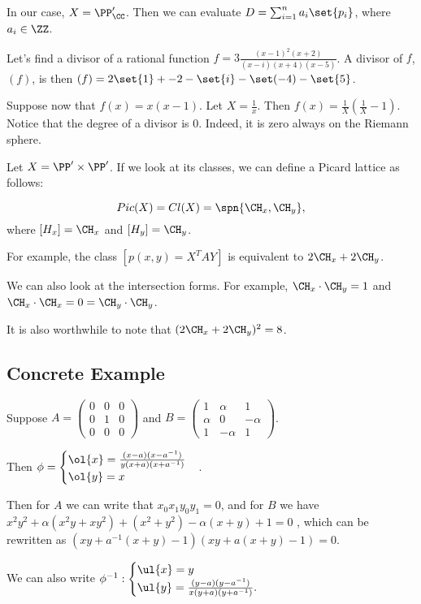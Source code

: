 \documentclass[11pt]{scrartcl}
\begin{document}
  In our case, $X = \PP_{\CC}'$. Then we can evaluate
  $D = \sum_{i=1}^{n} a_{i} \set{p_{i}}$, where $a_{i} \in \ZZ$.

  Let's find a divisor of a rational function
  $f = 3 \frac{(x-1)^{2}(x+2)}{(x-i)(x+4)(x-5)}$. A divisor of $f$,
  $(f)$, is then $(f) = 2\set{1}+{-2} - \set{i} - \set(-4) - \set{5}$.

  Suppose now that $f(x) = x(x-1)$. Let $X = \frac{1}{x}$. Then
  $f(x) = \frac{1}{X}(\frac{1}{X} - 1)$. Notice that the degree of a
  divisor is 0. Indeed, it is zero always on the Riemann sphere.

  Let $X = \PP' \times \PP'$. If we look at its classes, we can define a Picard lattice as follows:
  
  \begin{equation}
    Pic(X) = Cl(X) = \spn{\CH_{x}, \CH_{y}}, 
  \end{equation}
  where $[H_{x}] = \CH_{x}$ and $[H_{y}] = \CH_{y}$.

  For example, the class $[p(x, y) = X^{T} A Y]$ is equivalent to $ 2\CH_{x} + 2\CH_{y}$.

  We can also look at the intersection forms. For example,
  $\CH_{x} \cdot \CH_{y} = 1$ and
  $\CH_{x} \cdot \CH_{x} = 0 = \CH_{y} \cdot \CH_{y}$.

  It is also worthwhile to note that $(2\CH_{x} + 2\CH_{y})^{2} = 8$.

  \subsection{Concrete Example}

  Suppose $A = \begin{pmatrix}
    0 & 0 & 0\\
    0 & 1 & 0\\
    0 & 0 & 0
  \end{pmatrix}$ and $B = \begin{pmatrix}
    1 & \alpha & 1 \\
    \alpha & 0 & - \alpha\\
    1 & -\alpha & 1
  \end{pmatrix}$.

  Then $\phi = \begin{cases}
    \ol{x} = \frac{(x-a)(x-a^{-1})}{y(x+a)(x+a^{-1})}\\
    \ol{y} = x
  \end{cases}$.

  Then for $A$ we can write that $x_{0}x_{1}y_{0}y_{1} = 0$, and for
  $B$ we have
  $x^{2}y^{2}+\alpha(x^{2}y + xy^{2})+ (x^{2}+y^{2}) - \alpha(x+y) + 1
  = 0$ , which can be rewritten as
  $(xy+a^{-1}(x+y) - 1)(xy+a(x+y) - 1) = 0$.

  We can also write $\phi^{-1}: \begin{cases}
    \ul{x} = y\\
    \ul{y} = \frac{(y-a)(y-a^{-1})}{x(y+a)(y+a^{-1})}.
  \end{cases}$

  
\end{document}
